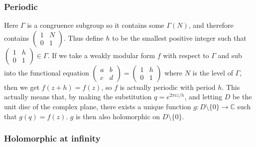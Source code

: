 \documentclass{article}
\theoremstyle{definition}
\theoremstyle{definition}
\theoremstyle{definition}
\newcommand{\SLZ}{\operatorname{SL}_2(\mathbb{Z})}
\newcommand{\Mabcd}{\begin{pmatrix} a&b\\c&d \end{pmatrix}}
\begin{document}

\subsubsection{Periodic}

Here $\Gamma$ is a congruence subgroup so it contains some $\Gamma(N)$, and therefore contains $\begin{pmatrix} 1&N\\0&1 \end{pmatrix}$. Thus define $h$ to be the smallest positive integer such that $\begin{pmatrix} 1&h\\0&1 \end{pmatrix}\in\Gamma$. If we take a weakly modular form $f$ with respect to $\Gamma$ and sub into the functional equation $\Mabcd = \begin{pmatrix} 1&h\\0&1 \end{pmatrix}$ where $N$ is the level of $\Gamma$, then we get $f(z+h)=f(z)$, so $f$ is actually periodic with period $h$. This actually means that, by making the substitution $q=e^{2\pi iz/h}$, and letting $D$ be the unit disc of the complex plane, there exists a unique function $g:D\setminus\{0\}\rightarrow\mathbb{C}$ such that $g(q)=f(z)$. $g$ is then also holomorphic on $D\setminus\{0\}$.

\subsubsection{Holomorphic at infinity}
\end{document}
